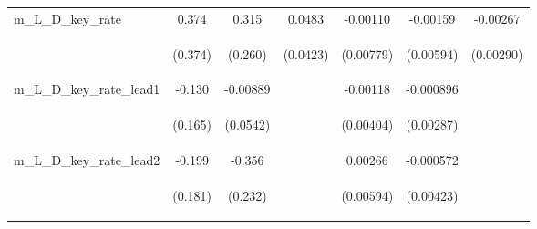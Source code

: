 \documentclass[]{article}
\begin{document}
\begin{center}
\begin{tabular}{lcccccc}
m\_L\_D\_key\_rate & 0.374 & 0.315 & 0.0483 & -0.00110 & -0.00159 & -0.00267 \\
\vspace{4pt} & \begin{footnotesize}(0.374)\end{footnotesize} & \begin{footnotesize}(0.260)\end{footnotesize} & \begin{footnotesize}(0.0423)\end{footnotesize} & \begin{footnotesize}(0.00779)\end{footnotesize} & \begin{footnotesize}(0.00594)\end{footnotesize} & \begin{footnotesize}(0.00290)\end{footnotesize} \\
m\_L\_D\_key\_rate\_lead1 & -0.130 & -0.00889 &  & -0.00118 & -0.000896 &  \\
\vspace{4pt} & \begin{footnotesize}(0.165)\end{footnotesize} & \begin{footnotesize}(0.0542)\end{footnotesize} & \begin{footnotesize}\end{footnotesize} & \begin{footnotesize}(0.00404)\end{footnotesize} & \begin{footnotesize}(0.00287)\end{footnotesize} & \begin{footnotesize}\end{footnotesize} \\
m\_L\_D\_key\_rate\_lead2 & -0.199 & -0.356 &  & 0.00266 & -0.000572 &  \\
\vspace{4pt} & \begin{footnotesize}(0.181)\end{footnotesize} & \begin{footnotesize}(0.232)\end{footnotesize} & \begin{footnotesize}\end{footnotesize} & \begin{footnotesize}(0.00594)\end{footnotesize} & \begin{footnotesize}(0.00423)\end{footnotesize} & \begin{footnotesize}\end{footnotesize} \\

\end{tabular}
\end{center}
\end{document}
